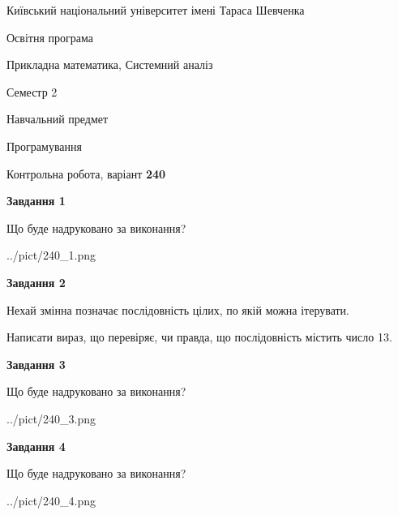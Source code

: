 \documentclass[12pt, ukrainian]{article}
\begin{document}
{{\begin {small}\par
{ \center  Київський національний університет імені Тараса Шевченка \par}
{\parbox {5 cm}{Освітня програма \hfill}{\parbox {8 cm}{Прикладна математика, Системний аналіз \hfill}}\parbox {5 cm}{\hfill Семестр 2}}\par
{\parbox {5 cm} {Навчальний предмет \hfill}\parbox {7 cm}{Програмування \hfill}\parbox {6cm}{\hfill}\par}\vspace{-7pt} \end{small}}{\center Контрольна робота, варіант  \No \textbf
{ 240 }\par}}
{
\begin {large}
{\begin {center}\textbf{Завдання 1}\end {center}}\par
Що буде надруковано за виконання?\par\par
\begin{center}
	{../pict/240_1.png}
\end{center}
\newpage

{\begin {center}\textbf{Завдання 2}\end {center}}\par
Нехай змінна  позначає послідовність цілих, по якій можна ітерувати.

Написати вираз, що перевіряє, чи правда, що послідовність  містить число 13.\par
\newpage

{\begin {center}\textbf{Завдання 3}\end {center}}\par
Що буде надруковано за виконання?\par
\begin{center}
	{../pict/240_3.png}
\end{center}
\newpage

{\begin {center}\textbf{Завдання 4}\end {center}}\par
Що буде надруковано за виконання?\par
\begin{center}
	{../pict/240_4.png}
\end{center}
\newpage


\end{large}}
\end{document}
